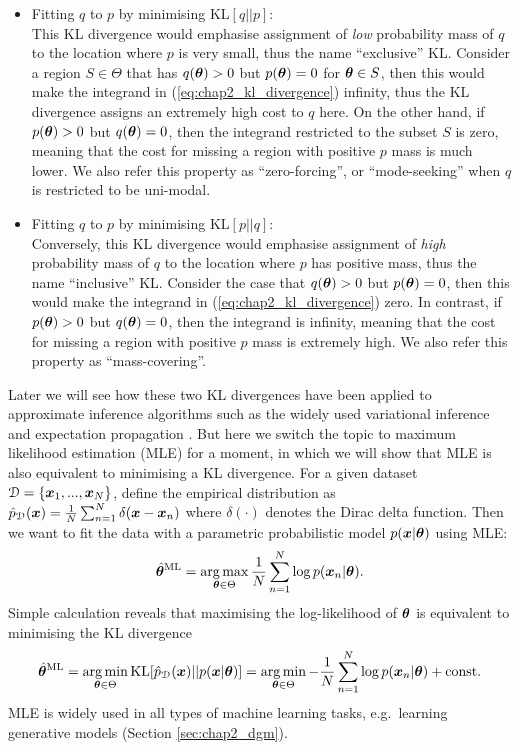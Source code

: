 \begin{itemize}
\item Fitting $q$ to $p$ by minimising $\mathrm{KL}[q||p]$: \\
This KL divergence would emphasise assignment of \emph{low} probability mass of $q$ to the location where $p$ is very small, thus the name ``exclusive'' KL. Consider a region $S \in \Theta$ that has $q(\bm{\theta}) > 0$ but $p(\bm{\theta}) = 0$ for $\bm{\theta} \in S$, then this would make the integrand in (\ref{eq:chap2_kl_divergence}) infinity, thus the KL divergence assigns an extremely high cost to $q$ here. On the other hand, if $p(\bm{\theta}) > 0$ but $q(\bm{\theta}) = 0$, then the integrand restricted to the subset $S$ is zero, meaning that the cost for missing a region with positive $p$ mass is much lower. We also refer this property as ``zero-forcing'', or ``mode-seeking'' when $q$ is restricted to be uni-modal.

\item Fitting $q$ to $p$ by minimising $\mathrm{KL}[p||q]$: \\
Conversely, this KL divergence would emphasise assignment of \emph{high} probability mass of $q$ to the location where $p$ has positive mass, thus the name ``inclusive'' KL. Consider the case that $q(\bm{\theta}) > 0$ but $p(\bm{\theta}) = 0$, then this would make the integrand in (\ref{eq:chap2_kl_divergence}) zero. In contrast, if $p(\bm{\theta}) > 0$ but $q(\bm{\theta}) = 0$, then the integrand is infinity, meaning that the cost for missing a region with positive $p$ mass is extremely high. We also refer this property as ``mass-covering''.

\end{itemize}

Later we will see how these two KL divergences have been applied to approximate inference algorithms such as the widely used variational inference \citep{jordan:vi1999, beal:vi2003} and expectation propagation \citep{minka:ep2001}. But here we switch the topic to maximum likelihood estimation (MLE) \citep{fisher:mle1922} for a moment, in which we will show that MLE is also equivalent to minimising a KL divergence. For a given dataset $\mathcal{D} = \{\bm{x}_1, ..., \bm{x}_N \}$, define the empirical distribution as $\hat{p}_{\mathcal{D}}(\bm{x}) = \frac{1}{N} \sum_{n=1}^{N} \delta(\bm{x} - \bm{x}_n)$ where $\delta(\cdot)$ denotes the Dirac delta function. Then we want to fit the data with a parametric probabilistic model $p(\bm{x}|\bm{\theta})$ using MLE:
\begin{equation}
\hat{\bm{\theta}}^{\text{ML}} = \operatorname*{arg\,max}_{\bm{\theta} \in \Theta} \frac{1}{N} \sum_{n=1}^{N} \log p(\bm{x}_n | \bm{\theta}).
\end{equation}
Simple calculation reveals that maximising the log-likelihood of $\bm{\theta}$ is equivalent to minimising the KL divergence
\begin{equation*}
\hat{\bm{\theta}}^{\text{ML}} = \operatorname*{arg\,min}_{\bm{\theta} \in \Theta} \mathrm{KL}[\hat{p}_{\mathcal{D}}(\bm{x}) || p(\bm{x}| \bm{\theta}) ] = \operatorname*{arg\,min}_{\bm{\theta} \in \Theta} -\frac{1}{N} \sum_{n=1}^{N} \log p(\bm{x}_n | \bm{\theta}) + \text{const}.
\end{equation*}
MLE is widely used in all types of machine learning tasks, e.g.~learning generative models (Section \ref{sec:chap2_dgm}). 

